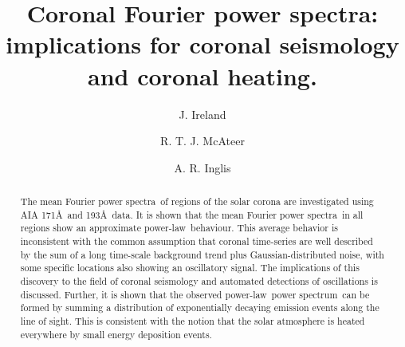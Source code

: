 \documentclass[onecolumn]{emulateapj}
\newcommand{\PS}{power spectrum}
\newcommand{\PA}{power spectra}
\newcommand{\PL}{power-law}
\newcommand{\mFpa}{mean Fourier \PA}
\begin{document}

\title{Coronal Fourier power spectra: implications for coronal
  seismology and coronal heating.}


\author{J. Ireland}

\author{R. T. J. McAteer}

\author{A. R. Inglis}


\begin{abstract}
The \mFpa\ of regions of the solar corona are investigated using AIA
171\AA\ and 193\AA\ data.  It is shown that the \mFpa\ in all regions
show an approximate \PL\ behaviour.  This average behavior is
inconsistent with the common assumption that coronal time-series are
well described by the sum of a long time-scale background trend plus
Gaussian-distributed noise, with some specific locations also showing
an oscillatory signal.  The implications of this discovery to the
field of coronal seismology and automated detections of oscillations
is discussed.  Further, it is shown that the observed \PL\ \PS\ can be
formed by summing a distribution of exponentially decaying emission
events along the line of sight.  This is consistent with the notion
that the solar atmosphere is heated everywhere by small energy
deposition events.
\end{abstract}
\end{document}
